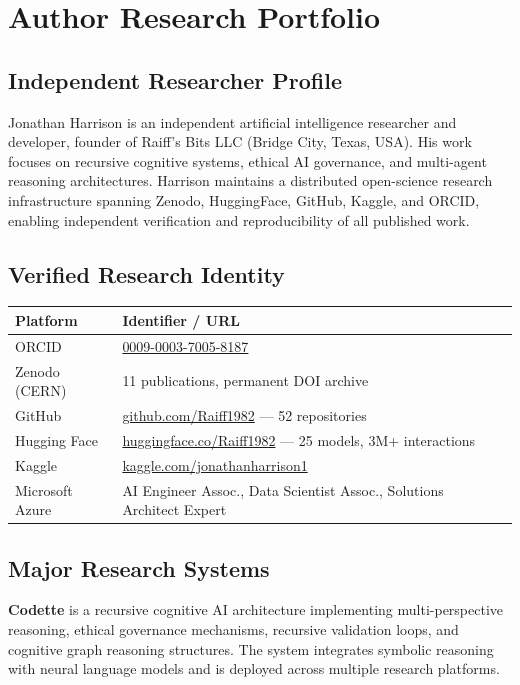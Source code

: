 \documentclass[11pt,a4paper]{article}
\begin{document}


\clearpage
\appendix
\section{Author Research Portfolio}
\label{app:portfolio}

\subsection{Independent Researcher Profile}
Jonathan Harrison is an independent artificial intelligence researcher and developer, founder of Raiff's Bits LLC (Bridge City, Texas, USA). His work focuses on recursive cognitive systems, ethical AI governance, and multi-agent reasoning architectures. Harrison maintains a distributed open-science research infrastructure spanning Zenodo, HuggingFace, GitHub, Kaggle, and ORCID, enabling independent verification and reproducibility of all published work.

\subsection{Verified Research Identity}
\begin{table}[H]
\centering
\begin{tabular}{@{}ll@{}}
\toprule
\textbf{Platform} & \textbf{Identifier / URL} \\
\midrule
ORCID         & \href{https://orcid.org/0009-0003-7005-8187}{0009-0003-7005-8187} \\
Zenodo (CERN) & 11 publications, permanent DOI archive \\
GitHub        & \href{https://github.com/Raiff1982}{github.com/Raiff1982} --- 52 repositories \\
Hugging Face  & \href{https://huggingface.co/Raiff1982}{huggingface.co/Raiff1982} --- 25 models, 3M+ interactions \\
Kaggle        & \href{https://kaggle.com/jonathanharrison1}{kaggle.com/jonathanharrison1} \\
Microsoft Azure & AI Engineer Assoc., Data Scientist Assoc., Solutions Architect Expert \\
\bottomrule
\end{tabular}
\end{table}

\subsection{Major Research Systems}
\textbf{Codette} is a recursive cognitive AI architecture implementing multi-perspective reasoning, ethical governance mechanisms, recursive validation loops, and cognitive graph reasoning structures. The system integrates symbolic reasoning with neural language models and is deployed across multiple research platforms.
\end{document}
